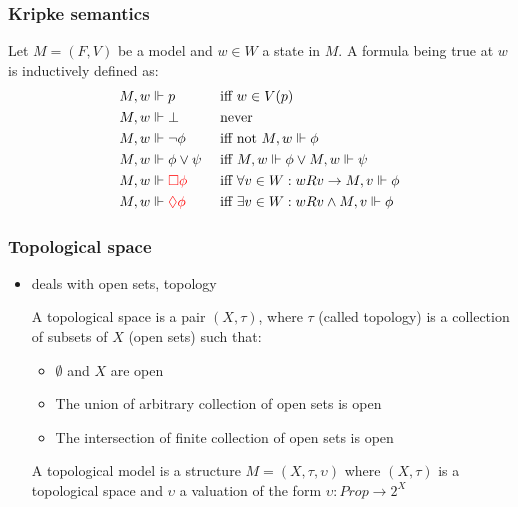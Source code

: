 \documentclass[hyperref={pdfpagelabels=false},t,10pt]{beamer}
\begin{document}
\begin{frame}
  \frametitle{Kripke semantics}

  \begin{definition}
      Let $M = (F,V)$ be a model and $w \in W$ a state in $M$. A formula being true at $w$ is inductively defined as: 
      \begin{align*}
        M, w &\Vdash p &&\text{ iff } w \in V(p) \\
        M, w &\Vdash \bot  &&\text{ never } \\
        M, w &\Vdash \neg \phi &&\text{ iff not } M, w \Vdash \phi \\ 
        M, w &\Vdash \phi \lor \psi &&\text{ iff } M,w \Vdash \phi \lor M,w \Vdash \psi \\
        M, w &\Vdash \textcolor{red}{\Box \phi} &&\text{ iff } \forall v \in W : wRv \rightarrow M, v \Vdash \phi \\
        M, w &\Vdash \textcolor{red}{\lozenge \phi} &&\text{ iff } \exists v \in W : wRv \land M,v \Vdash \phi
    \end{align*}  
  \end{definition}


  
\end{frame}



\begin{frame}
  \frametitle{Topological space}
  \begin{itemize}
    \item deals with open sets, topology \pause %
    \begin{definition}
             A topological space is a pair $(X, \tau)$, where $\tau$ (called topology) is a collection of subsets of $X$ (open sets) such that: \pause
        \begin{itemize}
          \item $\emptyset$ and $X$ are open
          \item The union of arbitrary collection of open sets is open
          \item The intersection of finite collection of open sets is open
        \end{itemize} \pause
          A topological model is a structure $M = (X,\tau, \upsilon)$ where $(X, \tau)$ is a topological space and $\upsilon$ a valuation of the form $\upsilon : Prop \rightarrow 2^X$  
    \end{definition}
    \end{itemize}
    \end{frame}
\end{document}
